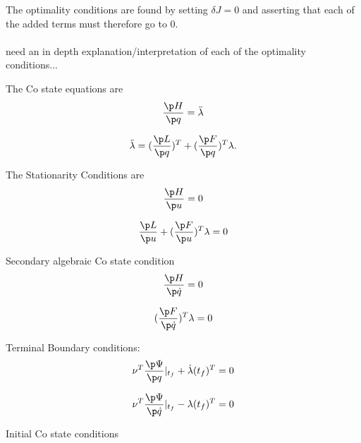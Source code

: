 The optimality conditions are found by setting $\delta J = 0 $ and asserting that each of the added terms must therefore go to 0.\\\\

{\color{red} need an in depth explanation/interpretation of each of the optimality conditions...}

The Co state equations are\\
\begin{equation}
    \frac{\p H}{ \p q } = \ddot \lambda 
\end{equation}

\begin{equation}
    \ddot \lambda = ( \frac{\p L}{\p q}  )^T + ( \frac{\p F}{\p q} )^T \lambda .
\end{equation}

The Stationarity Conditions are\\

\begin{equation}
    \frac{\p H}{\p u} = 0 
\end{equation}

\begin{equation}
    \frac{\p L}{\p u} +( \frac{\p F}{\p u} )^T \lambda = 0
\end{equation}



Secondary algebraic Co state condition\\

\begin{equation}
    \frac{\p H}{\p \dot q} = 0
\end{equation}

\begin{equation}
    (\frac{\p F}{\p \dot q})^T \lambda = 0 
\end{equation}


Terminal Boundary conditions:\\

\begin{equation}
    \nu^T \frac{\p \Psi}{\p q}|_{t_f} + \dot \lambda(t_f)^T = 0
\end{equation}

\begin{equation}
    \nu^T \frac{\p \Psi}{\p \dot q}|_{t_f} - \lambda(t_f)^T = 0
\end{equation}


Initial Co state conditions\\

